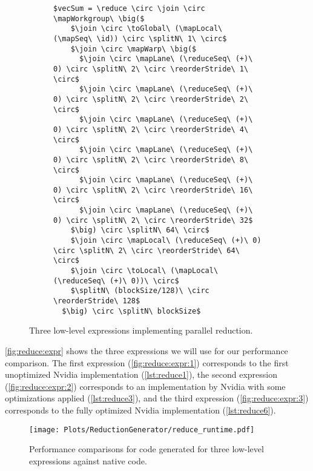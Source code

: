 \begin{figure*}[t]
\begin{subfigure}[b]{\linewidth}
\vspace{0em}
\begin{minipage}{.05\linewidth}
\caption{}
\label{fig:reduce:expr:3}
\end{minipage}
\hfill
\begin{minipage}{.9\linewidth}
\begin{lstlisting}[mathescape, basicstyle=\small\rmfamily]
$vecSum = \reduce \circ \join \circ \mapWorkgroup\ \big($
    $\join \circ \toGlobal\ (\mapLocal\ (\mapSeq\ \id)) \circ \splitN\ 1\ \circ$
    $\join \circ \mapWarp\ \big($
      $\join \circ \mapLane\ (\reduceSeq\ (+)\ 0) \circ \splitN\ 2\ \circ \reorderStride\ 1\ \circ$
      $\join \circ \mapLane\ (\reduceSeq\ (+)\ 0) \circ \splitN\ 2\ \circ \reorderStride\ 2\ \circ$
      $\join \circ \mapLane\ (\reduceSeq\ (+)\ 0) \circ \splitN\ 2\ \circ \reorderStride\ 4\ \circ$
      $\join \circ \mapLane\ (\reduceSeq\ (+)\ 0) \circ \splitN\ 2\ \circ \reorderStride\ 8\ \circ$
      $\join \circ \mapLane\ (\reduceSeq\ (+)\ 0) \circ \splitN\ 2\ \circ \reorderStride\ 16\ \circ$
      $\join \circ \mapLane\ (\reduceSeq\ (+)\ 0) \circ \splitN\ 2\ \circ \reorderStride\ 32$
    $\big) \circ \splitN\ 64\ \circ$
    $\join \circ \mapLocal\ (\reduceSeq\ (+)\ 0) \circ \splitN\ 2\ \circ \reorderStride\ 64\ \circ$
    $\join \circ \toLocal\ (\mapLocal\ (\reduceSeq\ (+)\ 0))\ \circ$
    $\splitN\ (blockSize/128)\ \circ \reorderStride\ 128$
  $\big) \circ \splitN\ blockSize$
\end{lstlisting}
\end{minipage}
\end{subfigure}

\caption{Three low-level expressions implementing parallel reduction.}
\label{fig:reduce:expr}
\end{figure*}


\autoref{fig:reduce:expr} shows the three expressions we will use for our performance comparison.
The first expression (\autoref{fig:reduce:expr:1}) corresponds to the first unoptimized Nvidia implementation (\autoref{lst:reduce1}),
the second expression (\autoref{fig:reduce:expr:2}) corresponds to an implementation by Nvidia with some optimizations applied (\autoref{lst:reduce3}), and
the third expression (\autoref{fig:reduce:expr:3}) corresponds to the fully optimized Nvidia implementation (\autoref{lst:reduce6}).


\begin{figure}
  \centering
  \texttt{[image: Plots/ReductionGenerator/reduce\_runtime.pdf]}
  \caption{Performance comparisons for code generated for three low-level expressions against native \OpenCL code.}
  \label{fig:reduce:expr:performance}
\end{figure}

